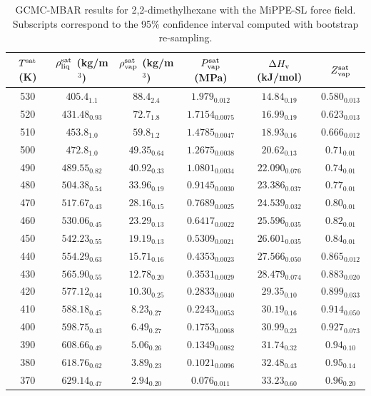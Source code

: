 \documentclass[journal=jctc,manuscript=article]{achemso}
\begin{document}
\begin{table}[htb!]
	\caption{GCMC-MBAR results for 2,2-dimethylhexane with the MiPPE-SL force field. Subscripts correspond to the 95\% confidence interval computed with bootstrap re-sampling.}
	\begin{center}
		\begin{tabular}{|c|c|c|c|c|c|}
			\hline
			$T^{\rm sat}$ (K) & $\rho_{\rm liq}^{\rm sat}$ (kg/m$^3$) & $\rho_{\rm vap}^{\rm sat}$ (kg/m$^3$) & $P_{\rm vap}^{\rm sat}$ (MPa) & $\Delta H_{\rm v}$ (kJ/mol) & $Z_{\rm vap}^{\rm sat}$ \\ \hline
			530 & $405.4_{1.1}$ & $88.4_{2.4}$ & $1.979_{0.012}$ & $14.84_{0.19}$ & $0.580_{0.013}$ \\
			520 & $431.48_{0.93}$ & $72.7_{1.8}$ & $1.7154_{0.0075}$ & $16.99_{0.19}$ & $0.623_{0.013}$ \\
			510 & $453.8_{1.0}$ & $59.8_{1.2}$ & $1.4785_{0.0047}$ & $18.93_{0.16}$ & $0.666_{0.012}$ \\
			500 & $472.8_{1.0}$ & $49.35_{0.64}$ & $1.2675_{0.0038}$ & $20.62_{0.13}$ & $0.71_{0.01}$ \\
			490 & $489.55_{0.82}$ & $40.92_{0.33}$ & $1.0801_{0.0034}$ & $22.090_{0.076}$ & $0.74_{0.01}$ \\
			480 & $504.38_{0.54}$ & $33.96_{0.19}$ & $0.9145_{0.0030}$ & $23.386_{0.037}$ & $0.77_{0.01}$ \\
			470 & $517.67_{0.43}$ & $28.16_{0.15}$ & $0.7689_{0.0025}$ & $24.539_{0.032}$ & $0.80_{0.01}$ \\
			460 & $530.06_{0.45}$ & $23.29_{0.13}$ & $0.6417_{0.0022}$ & $25.596_{0.035}$ & $0.82_{0.01}$ \\
			450 & $542.23_{0.55}$ & $19.19_{0.13}$ & $0.5309_{0.0021}$ & $26.601_{0.035}$ & $0.84_{0.01}$ \\
			440 & $554.29_{0.63}$ & $15.71_{0.16}$ & $0.4353_{0.0023}$ & $27.566_{0.050}$ & $0.865_{0.012}$ \\
			430 & $565.90_{0.55}$ & $12.78_{0.20}$ & $0.3531_{0.0029}$ & $28.479_{0.074}$ & $0.883_{0.020}$ \\
			420 & $577.12_{0.44}$ & $10.30_{0.25}$ & $0.2833_{0.0040}$ & $29.35_{0.10}$ & $0.899_{0.033}$ \\
			410 & $588.18_{0.45}$ & $8.23_{0.27}$ & $0.2243_{0.0053}$ & $30.19_{0.16}$ & $0.914_{0.050}$ \\
			400 & $598.75_{0.43}$ & $6.49_{0.27}$ & $0.1753_{0.0068}$ & $30.99_{0.23}$ & $0.927_{0.073}$ \\
			390 & $608.66_{0.49}$ & $5.06_{0.26}$ & $0.1349_{0.0082}$ & $31.74_{0.32}$ & $0.94_{0.10}$ \\
			380 & $618.76_{0.62}$ & $3.89_{0.23}$ & $0.1021_{0.0096}$ & $32.48_{0.43}$ & $0.95_{0.14}$ \\
			370 & $629.14_{0.47}$ & $2.94_{0.20}$ & $0.076_{0.011}$ & $33.23_{0.60}$ & $0.96_{0.20}$ \\
			\hline
		\end{tabular}
	\end{center}
\end{table}
\end{document}
